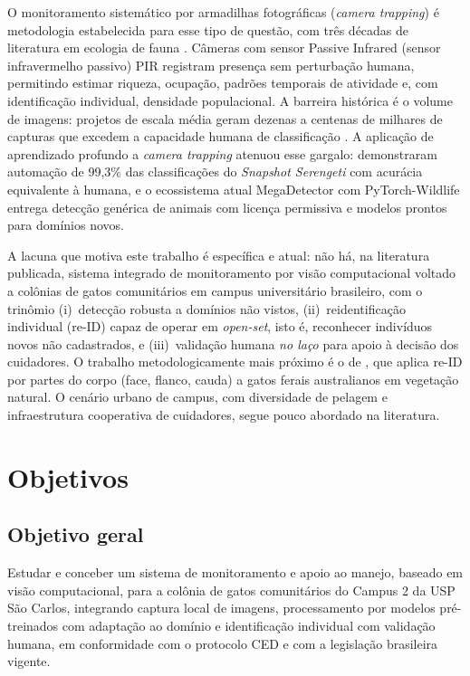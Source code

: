 O monitoramento sistemático por armadilhas fotográficas (\textit{camera trapping}) é metodologia estabelecida para esse tipo de questão, com três décadas de literatura em ecologia de fauna \cite{bruce2025largescale,cordier2022africa,swanson2015snapshot,cove2022capital}. Câmeras com sensor Passive Infrared (sensor infravermelho passivo) PIR registram presença sem perturbação humana, permitindo estimar riqueza, ocupação, padrões temporais de atividade e, com identificação individual, densidade populacional. A barreira histórica é o volume de imagens: projetos de escala média geram dezenas a centenas de milhares de capturas que excedem a capacidade humana de classificação \cite{norouzzadeh2018automatically,bruce2025largescale}. A aplicação de aprendizado profundo a \textit{camera trapping} atenuou esse gargalo:  demonstraram automação de 99,3\% das classificações do \textit{Snapshot Serengeti} com acurácia equivalente à humana, e o ecossistema atual MegaDetector com PyTorch-Wildlife \cite{hernandez2024pytorchwildlife,microsoft_cameratraps_repo} entrega detecção genérica de animais com licença permissiva e modelos prontos para domínios novos.


A lacuna que motiva este trabalho é específica e atual: não há, na literatura publicada, sistema integrado de monitoramento por visão computacional voltado a colônias de gatos comunitários em campus universitário brasileiro, com o trinômio (i)~detecção robusta a domínios não vistos, (ii)~reidentificação individual (re-ID) capaz de operar em \textit{open-set}, isto é, reconhecer indivíduos novos não cadastrados, e (iii)~validação humana \emph{no laço} para apoio à decisão dos cuidadores. O trabalho metodologicamente mais próximo é o de , que aplica re-ID por partes do corpo (face, flanco, cauda) a gatos ferais australianos em vegetação natural. O cenário urbano de campus, com diversidade de pelagem e infraestrutura cooperativa de cuidadores, segue pouco abordado na literatura.


\section{Objetivos}
\label{sec:objetivos}


\subsection*{Objetivo geral}


Estudar e conceber um sistema de monitoramento e apoio ao manejo, baseado em visão computacional, para a colônia de gatos comunitários do Campus 2 da USP São Carlos, integrando captura local de imagens, processamento por modelos pré-treinados com adaptação ao domínio e identificação individual com validação humana, em conformidade com o protocolo CED e com a legislação brasileira vigente.


